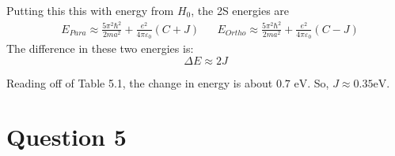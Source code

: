 \documentclass[11pt]{article}
\begin{document}
Putting this this with energy from $H_0$, the 2S energies are
\begin{align*}
& \boxed{E_{Para} \approx \frac{5\pi^2\hbar^2}{2ma^2} + \frac{e^2}{4\pi\varepsilon_0}(C + J)}&  & \boxed{E_{Ortho} \approx \frac{5\pi^2\hbar^2}{2ma^2} + \frac{e^2}{4\pi\varepsilon_0}(C - J)}
\end{align*}
The difference in these two energies is:
\[\boxed{\Delta E \approx 2J}\]

Reading off of Table 5.1, the change in energy is about $0.7 \text{ eV}$. So, $\boxed{J \approx 0.35 \text{eV}}$.

\newpage

\section*{Question 5}
\end{document}
